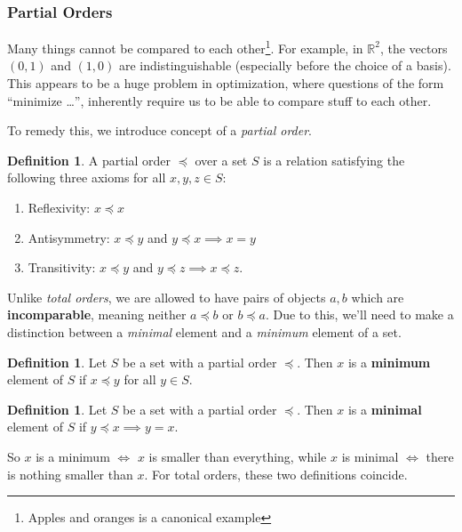 \documentclass[11pt]{article}
\numberwithin{equation}{section}
\theoremstyle{definition}
\newtheorem{definition}[theorem]{Definition}%
\newcommand{\bR}{\mathbb{R}}
\begin{document}
\subsubsection{Partial Orders}
Many things cannot be compared to each other\footnote{Apples and oranges is a canonical example}. For example, in $\bR^2$, the vectors $(0, 1)$ and $(1, 0)$ are indistinguishable (especially before the choice of a basis). This appears to be a huge problem in optimization, where questions of the form ``minimize \dots'', inherently require us to be able to compare stuff to each other. 

To remedy this, we introduce concept of a \textit{partial order}.

\begin{definition}
    A partial order $\preceq$ over a set $S$ is a relation satisfying the following three axioms for all $x, y, z\in S$:
    \begin{enumerate}[label=(\roman*)]
        \item Reflexivity: $x\preceq x$
        \item Antisymmetry: $x\preceq y$ and $y\preceq x\implies x=y$
        \item Transitivity: $x\preceq y$ and $y\preceq z\implies x\preceq z$.
    \end{enumerate}
\end{definition}

Unlike \textit{total orders}, we are allowed to have pairs of objects $a, b$ which are \textbf{incomparable}, meaning neither $a\preceq b$ or $b\preceq a$. Due to this, we'll need to make a distinction between a \textit{minimal} element and a \textit{minimum} element of a set.

\begin{definition}
    Let $S$ be a set with a partial order $\preceq$. Then $x$ is a \textbf{minimum} element of $S$ if $x\preceq y$ for all $y\in S$. 
\end{definition}
\begin{definition}
    Let $S$ be a set with a partial order $\preceq$. Then $x$ is a \textbf{minimal} element of $S$ if $y\preceq x\implies y=x$.
\end{definition}
So $x$ is a minimum $\iff$ $x$ is smaller than everything, while $x$ is minimal $\iff$ there is nothing smaller than $x$. For total orders, these two definitions coincide.
\end{document}
